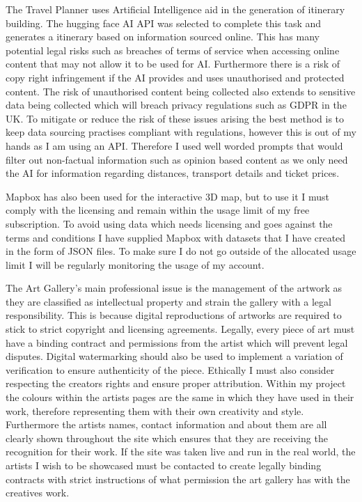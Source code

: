 \documentclass[]{project_final}
\begin{document}
The Travel Planner uses Artificial Intelligence aid in the generation of itinerary building. The hugging face AI API was selected to complete this task and generates a itinerary based on information sourced online. This has many potential legal risks such as breaches of terms of service when accessing online content that may not allow it to be used for AI. Furthermore there is a risk of copy right infringement if the AI provides and uses unauthorised and protected content. The risk of unauthorised content being collected also extends to sensitive data being collected which will breach privacy regulations such as GDPR in the UK.
To mitigate or reduce the risk of these issues arising the best method is to keep data sourcing practises compliant with regulations, however this is out of my hands as I am using an API. Therefore I used well worded prompts that would filter out non-factual information such as opinion based content as we only need the AI for information regarding distances, transport details and ticket prices.

Mapbox has also been used for the interactive 3D map, but to use it I must comply with the licensing and remain within the usage limit of my free subscription. To avoid using data which needs licensing and goes against the terms and conditions I have supplied Mapbox with datasets that I have created in the form of JSON files. To make sure I do not go outside of the allocated usage limit I will be regularly monitoring the usage of my account.


The Art Gallery's main professional issue is the management of the artwork as they are classified as intellectual property and strain the gallery with a legal responsibility. This is because digital reproductions of artworks are required to stick to strict copyright and licensing agreements. Legally, every piece of art must have a binding contract and permissions from the artist which will prevent legal disputes. Digital watermarking should also be used to implement a variation of verification to ensure authenticity of the piece.
Ethically I must also consider respecting the creators rights and ensure proper attribution. Within my project the colours within the artists pages are the same in which they have used in their work, therefore representing them with their own creativity and style. Furthermore the artists names, contact information and about them are all clearly shown throughout the site which ensures that they are receiving the recognition for their work. If the site was taken live and run in the real world, the artists I wish to be showcased must be contacted to create legally binding contracts with strict instructions of what permission the art gallery has with the creatives work.
\end{document}
